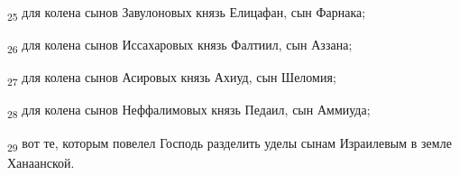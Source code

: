 \begin{tcolorbox}
\textsubscript{25} для колена сынов Завулоновых князь Елицафан, сын Фарнака;
\end{tcolorbox}
\begin{tcolorbox}
\textsubscript{26} для колена сынов Иссахаровых князь Фалтиил, сын Аззана;
\end{tcolorbox}
\begin{tcolorbox}
\textsubscript{27} для колена сынов Асировых князь Ахиуд, сын Шеломия;
\end{tcolorbox}
\begin{tcolorbox}
\textsubscript{28} для колена сынов Неффалимовых князь Педаил, сын Аммиуда;
\end{tcolorbox}
\begin{tcolorbox}
\textsubscript{29} вот те, которым повелел Господь разделить уделы сынам Израилевым в земле Ханаанской.
\end{tcolorbox}
